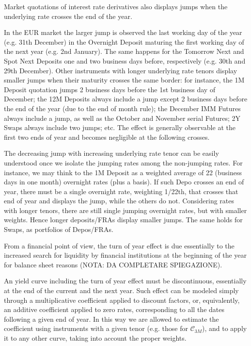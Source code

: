 \documentclass[11pt,reqno]{amsart}
\begin{document}
Market quotations of interest rate derivatives also displays jumps when the underlying rate crosses the end of the year.
\par
In the EUR market the larger jump is observed the last working day of the year (e.g. 31th December) in the Overnight Deposit maturing the first working day of the next year (e.g. 2nd January).
The same happens for the Tomorrow Next and Spot Next Deposits one and two business days before, respectively (e.g. 30th and 29th December).
Other instruments with longer underlying rate tenors display smaller jumps when their maturity crosses the same border: for instance, the 1M Deposit quotation jumps 2 business days before the 1st business day of December; the 12M Deposits always include a jump except 2 business days before the end of the year (due to the end of month rule); the December IMM Futures always include a jump, as well as the October and November serial Futures; 2Y Swaps always include two jumps; etc.
The effect is generally observable at the first two ends of year and becomes negligible at the following crosses.
\par
The decreasing jump with increasing underlying rate tenor can be easily understood once we isolate the jumping rates among the non-jumping rates.
For instance, we may think to the 1M Deposit as a weighted average of 22 (business days in one month) overnight rates (plus a basis). If such Depo crosses an end of year, there must be a single overnight rate, weighting 1/22th, that crosses that end of year and displays the jump, while the others do not. Considering rates with longer tenors, there are still single jumping overnight rates, but with smaller weights. Hence longer deposits/FRAs display smaller jumps. The same holds for Swaps, as portfolios of Depos/FRAs.
\par
From a financial point of view, the turn of year effect is due essentially to the increased search for liquidity by financial institutions at the beginning of the year for balance sheet reasons (NOTA: DA COMPLETARE SPIEGAZIONE).
\par
An yield curve including the turn of year effect must be discontinuous, essentially at the end of the current and the next year.
Such effect can be modeled simply through a multiplicative coefficient applied to discount factors, or, equivalently, an additive coefficient applied to zero rates, corresponding to all the dates following a given end of year.
In this way we are allowed to estimate the coefficient using instruments with a given tenor (e.g. those for $\mathcal C_{3M}$), and to apply it to any other curve, taking into account the proper weights.
\end{document}
